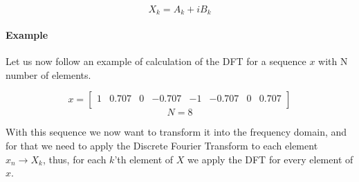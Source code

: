 \documentclass[
  oneside,
  11pt, a4paper,
  footinclude=true,
  headinclude=true,
  cleardoublepage=empty
]{scrbook}
\begin{document}
\begin{equation*}
    X_{k} = A_{k} + i B_{k}
\end{equation*}


\paragraph{Example} \label{example1} Let us now follow an example of calculation of the DFT for a sequence \(x\) with N number of elements.

\pagestyle{empty}

\begin{equation*}
    x = 
    \begin{bmatrix}
        1 & 0.707 & 0 & -0.707 & -1 & -0.707 & 0 & 0.707\\
    \end{bmatrix}
\end{equation*}
\begin{equation*}
    N = 8
\end{equation*}

With this sequence we now want to transform it into the frequency domain, and for that we need to apply the Discrete Fourier Transform to each element \( x_{n} \rightarrow X_{k} \), thus, for each \(k\)'th element of \(X\) we apply the DFT for every element of \(x\).
\end{document}
